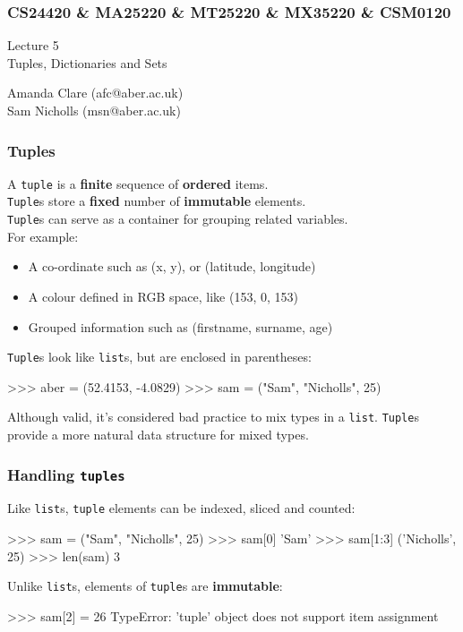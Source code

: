 \documentclass{beamer}
\begin{document}



\begin{frame}
\frametitle{CS24420 \& MA25220 \& MT25220 \& MX35220 \& CSM0120}

\begin{center}
\begin{huge}
Lecture 5\\
\bigskip
Tuples, Dictionaries and Sets
\end{huge}
\bigskip

Amanda Clare (afc@aber.ac.uk)\\
Sam Nicholls (msn@aber.ac.uk)

\end{center}
\end{frame}

\begin{frame}[fragile]
\frametitle{Tuples}
    A \texttt{tuple} is a \textbf{finite} sequence of \textbf{ordered} items.\\
    \texttt{Tuple}s store a \textbf{fixed} number of \textbf{immutable} elements.\\
    \texttt{Tuple}s can serve as a container for grouping related variables.
    \\For example:

    \begin{itemize}
        \item A co-ordinate such as (x, y), or (latitude, longitude)
        \item A colour defined in RGB space, like {\color{purple}(153, 0, 153)}
        \item Grouped information such as (firstname, surname, age)
    \end{itemize}

\vskip 0.3cm
    \texttt{Tuple}s look like \texttt{list}s, but are enclosed in parentheses:
\begin{code}
>>> aber = (52.4153, -4.0829)
>>> sam = ("Sam", "Nicholls", 25)
\end{code}
Although valid, it's considered bad practice to mix types in a \texttt{list}.
\texttt{Tuple}s provide a more natural data structure for mixed types.
\end{frame}


\begin{frame}[fragile]
\frametitle{Handling \texttt{tuples}}
    Like \texttt{list}s, \texttt{tuple} elements can be indexed, sliced and counted:
\begin{code}
>>> sam = ("Sam", "Nicholls", 25)
>>> sam[0]
'Sam'
>>> sam[1:3]
('Nicholls', 25)
>>> len(sam)
3
\end{code}

\vskip 0.3cm
Unlike \texttt{list}s, elements of \texttt{tuple}s are \textbf{immutable}:
\begin{code}
>>> sam[2] = 26
TypeError: 'tuple' object does not support
           item assignment
\end{code}
\end{frame}
\end{document}
